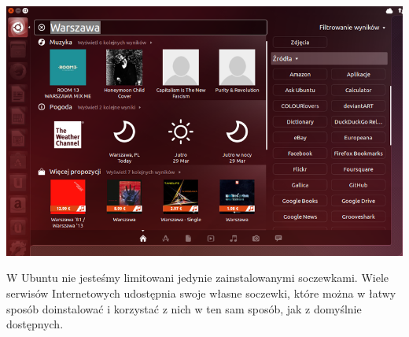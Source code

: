 \begin{center}
	\includegraphics[width=\linewidth]{images/unity_dash_wyszukiwanie3.png}
\end{center}

W Ubuntu nie jesteśmy limitowani jedynie zainstalowanymi soczewkami. Wiele serwisów Internetowych udostępnia swoje własne soczewki, które można w łatwy sposób doinstalować i korzystać z nich w ten sam sposób, jak z domyślnie dostępnych.
